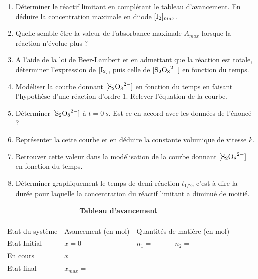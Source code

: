 \documentclass[a4paper,11pt,fleqn]{article}%
\begin{document}
\begin{enumerate}[resume]
    \item Déterminer le réactif limitant en complétant le tableau d'avancement. En déduire la concentration maximale en diiode $[\ce{I2}]_{max}$.
    \item Quelle semble être la valeur de l'absorbance maximale $A_{max}$ lorsque la réaction n'évolue plus ?
    \item A l'aide de la loi de Beer-Lambert et en admettant que la réaction est totale, déterminer l'expression de $[\ce{I2}]$, puis celle de $[\ce{S2O8^2-}]$ en fonction du temps.
    \item Modéliser la courbe donnant $[\ce{S2O8^2-}]$ en fonction du temps en faisant l'hypothèse d'une réaction d'ordre 1. Relever l'équation de la courbe.
    \item Déterminer $[\ce{S2O8^2-}]$ à $t=\SI{0}{s}$. Est ce en accord avec les données de l'énoncé ?
    \item Représenter la cette courbe et en déduire la constante volumique de vitesse $k$.
    \item Retrouver cette valeur dans la modélisation de la courbe donnant $[\ce{S2O8^2-}]$ en fonction du temps.
    \item Déterminer graphiquement le temps de demi-réaction $t_{1/2}$, c'est à dire la durée pour laquelle la concentration du réactif limitant a diminué de moitié.
\end{enumerate}
\begin{table}[h!]
    \centering
    \caption*{\textbf{Tableau d'avancement}}
    \begin{tabular}{|>{\centering}m{3cm}|m{3cm}|m{2cm}|m{2cm}||m{2cm}|m{2cm}|}\hline
        \multicolumn{2}{|>{\centering}m{6cm}|}{Équation de la réaction} & \multicolumn{4}{|m{8cm}|}{}\\
        \hline Etat du système & Avancement (en \unit{\mole}) & \multicolumn{4}{|m{8cm}|}{Quantités de matière (en \unit{\mole})}\\
        \hline Etat Initial & $x=0$ & $n_1 = $ & $n_2 =$ & &\\
        \hline En cours & $x$ & & & & \\
        \hline Etat final & $x_{max} =$ & & & & \\
        \hline
    \end{tabular}
    
    \label{tab:my_label}
\end{table}
\end{document}
